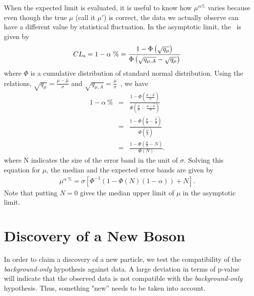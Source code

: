 When the expected limit is evaluated,  
it is useful to know how $\mu^{\alpha \%}$ varies 
because even though the true $\mu$ (call it $\mu'$) is correct, 
the data we actually observe can have a different value by statistical fluctuation.  
In the asymptotic limit, the \CLs\ is given by~\cite{combination_stat}
\begin{eqnarray} 
CL_\mathrm{s} 
= 1 - \alpha~\% 
= \frac{1 - \Phi\left(\sqrt{q_\mu}\right)}{\Phi\left(\sqrt{q_{\mu,A}} - \sqrt{q_\mu}\right)}   
\end{eqnarray} 
where $\Phi$ is a cumulative distribution of standard normal distribution. 
Using the relations, $\sqrt{q_\mu} = \frac{\mu - \hat{\mu}}{\sigma}$   
and $\sqrt{q_{\mu,A}} = \frac{\mu}{\sigma}$~\cite{cowan_asimov}, 
we have 
\begin{eqnarray} 
1 - \alpha~\% 
&=&   
\frac{1 - \Phi\left(\frac{\mu - \hat{\mu}}{\sigma} \right)}
       {\Phi\left( \frac{\mu}{\sigma} - \frac{\mu - \hat{\mu}}{\sigma} \right)} \\    
&=&   
\frac{1 - \Phi\left(\frac{\mu}{\sigma} - \frac{\hat{\mu}}{\sigma} \right)}
     {\Phi\left( \frac{\hat{\mu}}{\sigma} \right)} \\    
&=&   
\frac{1 - \Phi\left(\frac{\mu}{\sigma} - N \right)}
     {\Phi\left( N \right)}.    
\end{eqnarray}
where N indicates the size of the error band in the unit of $\sigma$.
Solving this equation for $\mu$, the median and the expected error bands are given by 
\begin{eqnarray} 
\mu^{\alpha~\%} 
= 
\sigma \left[ \Phi^{-1} \left( 1 - \Phi\left( N \right) 
\left( 1 - \alpha \right)  \right) + N \right].
\end{eqnarray} 
Note that putting $N=0$ gives the median upper limit of $\mu$ 
in the asymptotic limit. 



\section{Discovery of a New Boson}
\label{sec:stat_significance}

In order to claim a discovery of a new particle, we test the compatibility of 
the \textit{background-only} hypothesis against data. A large deviation in 
terms of p-value will indicate that the observed data is not compatible 
with the \textit{background-only} hypothesis. 
Thus, something "new'' needs to be taken into account. 

